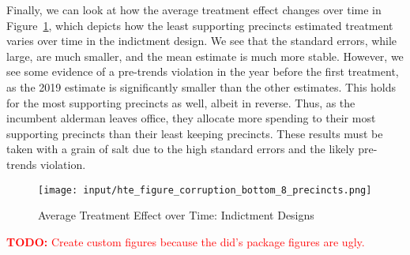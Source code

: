 Finally, we can look at how the average treatment effect changes over time in Figure~\ref{fig:att_comparison_corruption_bottom}, which depicts how the least supporting precincts estimated treatment varies over time in the indictment design.
We see that the standard errors, while large, are much smaller, and the mean estimate is much more stable.
However, we see some evidence of a pre-trends violation in the year before the first treatment, as the 2019 estimate is significantly smaller than the other estimates.
This holds for the most supporting precincts as well, albeit in reverse.
Thus, as the incumbent alderman leaves office, they allocate more spending to their most supporting precincts than their least keeping precincts.
These results must be taken with a grain of salt due to the high standard errors and the likely pre-trends violation.

\begin{figure}[H]
    \centering
    \texttt{[image: input/hte\_figure\_corruption\_bottom\_8\_precincts.png]}
    \caption{Average Treatment Effect over Time: Indictment Designs}
    \label{fig:att_comparison_corruption_bottom}
\end{figure}

\textcolor{red}{\textbf{TODO:} Create custom figures because the did's package figures are ugly.}